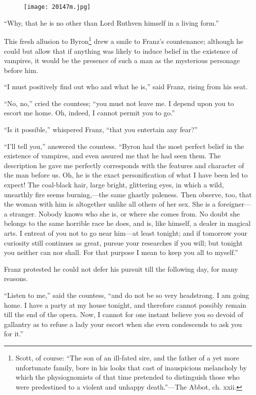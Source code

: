 \begin{figure}[ht]
\texttt{[image: 20147m.jpg]}
\end{figure}

“Why, that he is no other than Lord Ruthven himself in a living form.”

This fresh allusion to Byron\footnote[5]{Scott, of course: “The son of
an ill-fated sire, and the father of a yet more unfortunate family, bore
in his looks that cast of inauspicious melancholy by which the
physiognomists of that time pretended to distinguish those who were
predestined to a violent and unhappy death.”—The Abbot, ch. xxii.}
drew a smile to Franz’s countenance;
although he could but allow that if anything was likely to induce
belief in the existence of vampires, it would be the presence of such a
man as the mysterious personage before him.

“I must positively find out who and what he is,” said Franz, rising
from his seat.

“No, no,” cried the countess; “you must not leave me. I depend upon you
to escort me home. Oh, indeed, I cannot permit you to go.”

“Is it possible,” whispered Franz, “that you entertain any fear?”

“I’ll tell you,” answered the countess. “Byron had the most perfect
belief in the existence of vampires, and even assured me that he had
seen them. The description he gave me perfectly corresponds with the
features and character of the man before us. Oh, he is the exact
personification of what I have been led to expect! The coal-black hair,
large bright, glittering eyes, in which a wild, unearthly fire seems
burning,—the same ghastly paleness. Then observe, too, that the woman
with him is altogether unlike all others of her sex. She is a
foreigner—a stranger. Nobody knows who she is, or where she comes from.
No doubt she belongs to the same horrible race he does, and is, like
himself, a dealer in magical arts. I entreat of you not to go near
him—at least tonight; and if tomorrow your curiosity still continues as
great, pursue your researches if you will; but tonight you neither can
nor shall. For that purpose I mean to keep you all to myself.”

Franz protested he could not defer his pursuit till the following day,
for many reasons.

“Listen to me,” said the countess, “and do not be so very headstrong. I
am going home. I have a party at my house tonight, and therefore cannot
possibly remain till the end of the opera. Now, I cannot for one
instant believe you so devoid of gallantry as to refuse a lady your
escort when she even condescends to ask you for it.”

